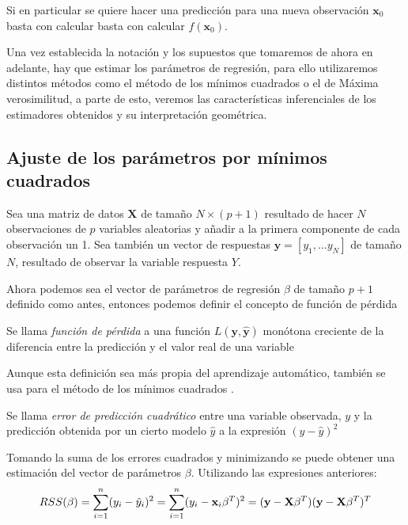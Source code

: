 \noindent Si en particular se quiere hacer una predicción para una nueva observación  $\mathbf{x}_0$ basta con calcular basta con calcular $f(\textbf{x}_0).$

\noindent Una vez establecida la notación y los supuestos que tomaremos de ahora en adelante, hay que estimar los parámetros de regresión, para ello utilizaremos distintos métodos como el método de los mínimos cuadrados o el de Máxima verosimilitud, a parte de esto, veremos las características inferenciales de los estimadores obtenidos y su interpretación geométrica. 

\subsection{Ajuste de los parámetros por mínimos cuadrados}
\noindent Sea una matriz de datos $\textbf{X}$ de tamaño $N\times (p+1)$ resultado de hacer $N$ observaciones de $p$ variables aleatorias y añadir a la primera componente de cada observación un 1. Sea también un vector de respuestas $\textbf{y}=[y_1,\ldots y_N]$ de tamaño $N$, resultado de observar la variable respuesta $Y$. 

\noindent Ahora podemos sea el vector de parámetros de regresión $\beta$ de tamaño $p+1$ definido como antes, entonces podemos definir el concepto de función de pérdida

\begin{defi}
Se llama \emph{función de pérdida} \cite{Hastie 2001} a una función $L(\textbf{y},\mathbf{\hat{y}})$ monótona creciente de la diferencia entre la predicción y el valor real de una variable
\end{defi}

\noindent Aunque esta definición sea más propia del aprendizaje automático, también se usa para el método de los mínimos cuadrados \cite{Abdi 2007}. 

\begin{defi}
Se llama \emph{error de predicción cuadrático} entre una variable observada, $y$ y la predicción obtenida por un cierto modelo $\hat{y}$ a la expresión $(y-\hat{y})^2$
\end{defi}

\noindent Tomando la suma de los errores cuadrados y minimizando se puede obtener una estimación  del vector de parámetros $\beta$. Utilizando las expresiones anteriores:
\begin{equation}
RSS(\beta)=\sum_{i=1}^n(y_i-\hat{y}_i)^2 = \sum_{i=1}^n(y_i-\textbf{x}_i\beta^T)^2=(\textbf{y}-\textbf{X}\beta^T)(\textbf{y}-\textbf{X}\beta^T)^T\\
\end{equation}

